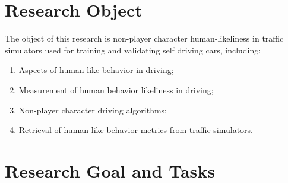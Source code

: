 \documentclass{VUMIFPS-master-intro}
\begin{document}


\section{Research Object}

The object of this research is non-player character human-likeliness in traffic simulators used for training and validating self driving cars, including:
\begin{enumerate}
	\item Aspects of human-like behavior in driving;
	\item Measurement of human behavior likeliness in driving;
	\item Non-player character driving algorithms;
	\item Retrieval of human-like behavior metrics from traffic simulators.
\end{enumerate}


\section{Research Goal and Tasks}

\end{document}
